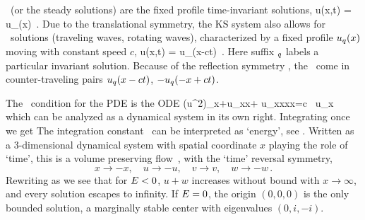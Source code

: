 
\Eqva\  (or the steady solutions)
are the fixed profile time-invariant solutions,
\beq
 u(x,t) = u_\stagn(x) %
\,.
Due to the translational symmetry,
the KS system also allows for \reqv\ solutions
(traveling waves, rotating waves),
characterized by a fixed profile $u_\stagn(x)$
moving with constant speed $c$, {\ie}
\beq
 u(x,t) =  u_\stagn(x-ct) %
\,.
Here suffix ${}_\stagn$ labels a particular invariant solution.
Because of the reflection symmetry ,
the \reqva\ come in counter-traveling pairs
$u_\stagn(x-ct)$, $-u_\stagn(-x+ct)$.

The \reqv\ condition for the {\KS} PDE 
is the ODE
\beq
{\textstyle{}}(u^2)_x+u_{xx}+ u_{xxxx}=c \, u_x
which can be analyzed as a dynamical system in its own right.
Integrating once we get
The integration constant \expctE\ can be interpreted as `energy',
see .
Written as a 3-dimen\-si\-on\-al dynamical system
with spatial coordinate $x$ playing the role of `time',
this is a volume preserving flow
\beq
{}%
\,,
  \label{eq:3dks}
\eeq{}
with the `time' reversal symmetry,
\[
x \to -x,\quad u \to -u, \quad v \to v, \quad w \to -w \,.
\]
 Rewriting  as 
\beq
{} %
we see that
for $E<0$,  $u+w$ increases without bound with $x \to \infty$,
and every solution escapes to infinity.
If $E=0$, the origin $(0,0,0)$ is the
only bounded  solution, a marginally stable center with
eigenvalues $(0, i,-i)$.


